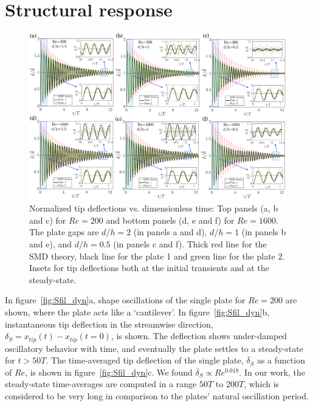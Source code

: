 \documentclass[aps,pre,twocolumn,aps,longbibliography]{revtex4-1}
\begin{document}
	
	\section{Structural response}
	
	
	
	\begin{figure}
		\begin{minipage}[c]{0.85\linewidth}
			\includegraphics[width=1\linewidth]{Fig07.pdf} 
		\end{minipage} 
		\caption{Normalized tip deflections vs. dimensionless time: Top panels (a, b and c) for $Re=200$ and bottom panels (d, e and f) for $Re=1600$. The plate gaps are $d/h=2$ (in panels a and d), $d/h=1$ (in panels b and e), and $d/h=0.5$ (in panels c and f). Thick red line for the SMD theory, black line for the plate 1 and green line for the plate 2. Insets for tip deflections both at the initial transients and at the steady-state.}
		\label{fig:transient_double_vs_Re}
	\end{figure} 
	
	In figure~\ref{fig:Sfil_dyn}a, shape oscillations of the single plate for $Re=200$ are shown, where the plate acts like a `cantilever'. In figure~\ref{fig:Sfil_dyn}b, instantaneous tip deflection in the streamwise direction, $\delta_S=x_{tip}(t)-x_{tip}(t=0)$, is shown. The deflection shows under-damped oscillatory behavior with time, and eventually the plate settles to a steady-state for $t>50T$. The time-averaged tip deflection of the single plate, $\overline{\delta}_S$ as a function of $Re$, is shown in figure~\ref{fig:Sfil_dyn}c. We found $\overline{\delta}_S\propto Re^{0.018}$. In our work, the steady-state time-averages are computed in a range $50T$ to $200T$, which is considered to be very long in comparison to the plates' natural oscillation period.
	
\end{document}
